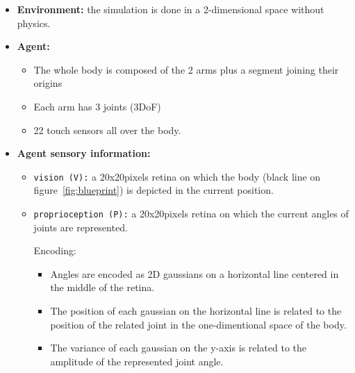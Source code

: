 \documentclass[11pt]{article}
\begin{document}
\begin{itemize}

    \item \textbf{Environment:} the simulation is done in a 2-dimensional space
        without physics.

    \item \textbf{Agent:} \begin{itemize}

            \item The whole body is composed of the 2 arms plus a segment
                joining their origins

            \item Each arm has 3 joints (3DoF)

            \item 22 touch sensors all over the body.

        \end{itemize}

    \item \textbf{Agent sensory information:}

        \begin{itemize}

            \item \texttt{vision (V):} a 20x20pixels retina on which the body
                (black line on figure~\ref{fig:blueprint}) is depicted in the
                current position.

            \item \texttt{proprioception (P):} a 20x20pixels retina on which
                the current angles of joints are represented.

                Encoding:

                \begin{itemize} 

                    \item Angles are encoded as 2D gaussians on a horizontal
                        line centered in the middle of the retina. 

                    \item The position of each gaussian on the horizontal line
                        is related to the position of the related joint in the
                        one-dimentional space of the body.

                    \item The variance of each gaussian on the y-axis is
                        related to the amplitude of the represented joint
                        angle.


\end{itemize}
\end{itemize}
\end{itemize}
\end{document}
